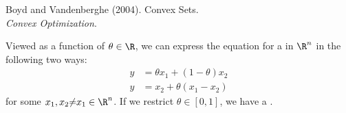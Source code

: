 \documentclass[11pt]{article}
\begin{document}
\label{Convex Optimization}

\newcommand{\relint}{\rvec{relint}}
\newcommand{\aff}{\rvec{aff}}
\newcommand{\conv}{\rvec{conv}}

\vspace{-1.7em}
{\scriptsize Boyd and Vandenberghe (2004). Convex Sets.\\ \textit{Convex Optimization}.\\ }


\begin{definition}
	Viewed as a function of $\theta \in \R$, we can express the equation for a  in $\R^n$ in the following two ways:
	\begin{align}
		y &= \theta x_1 + (1 - \theta) x_2 \\
		y &= x_2 + \theta (x_1 - x_2)
	\end{align}
	for some $x_1, x_2{\ne}x_1 \in \R^n$. If we restrict $\theta \in [0, 1]$, we have a . 
\end{definition}
\end{document}
